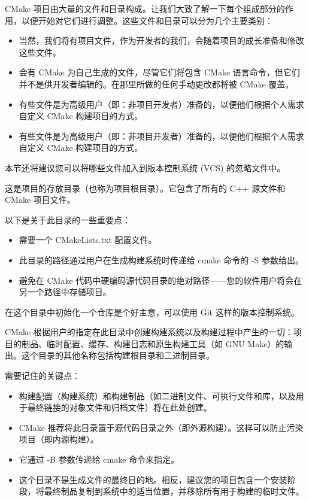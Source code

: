 CMake 项目由大量的文件和目录构成。让我们大致了解一下每个组成部分的作用，以便开始对它们进行调整。这些文件和目录可以分为几个主要类别：

\begin{itemize}
\item
当然，我们将有项目文件，作为开发者的我们，会随着项目的成长准备和修改这些文件。

\item
会有 CMake 为自己生成的文件，尽管它们将包含 CMake 语言命令，但它们并不是供开发者编辑的。在那里所做的任何手动更改都将被 CMake 覆盖。

\item
有些文件是为高级用户（即：非项目开发者）准备的，以便他们根据个人需求自定义 CMake 构建项目的方式。

\item
有些文件是为高级用户（即：非项目开发者）准备的，以便他们根据个人需求自定义 CMake 构建项目的方式。
\end{itemize}

本节还将建议您可以将哪些文件加入到版本控制系统 (VCS) 的忽略文件中。



这是项目的存放目录（也称为项目根目录）。它包含了所有的 C++ 源文件和 CMake 项目文件。

以下是关于此目录的一些重要点：

\begin{itemize}
\item
需要一个 CMakeLists.txt 配置文件。

\item
此目录的路径通过用户在生成构建系统时传递给 cmake 命令的 -S 参数给出。

\item
避免在 CMake 代码中硬编码源代码目录的绝对路径——您的软件用户将会在另一个路径中存储项目。
\end{itemize}

在这个目录中初始化一个仓库是个好主意，可以使用 Git 这样的版本控制系统。


CMake 根据用户的指定在此目录中创建构建系统以及构建过程中产生的一切：项目的制品、临时配置、缓存、构建日志和原生构建工具（如 GNU Make）的输出。这个目录的其他名称包括构建根目录和二进制目录。

需要记住的关键点：

\begin{itemize}
\item
构建配置（构建系统）和构建制品（如二进制文件、可执行文件和库，以及用于最终链接的对象文件和归档文件）将在此处创建。

\item
CMake 推荐将此目录置于源代码目录之外（即外源构建）。这样可以防止污染项目（即内源构建）。

\item
它通过 -B 参数传递给 cmake 命令来指定。

\item
这个目录不是生成文件的最终目的地。相反，建议您的项目包含一个安装阶段，将最终制品复制到系统中的适当位置，并移除所有用于构建的临时文件。
\end{itemize}

